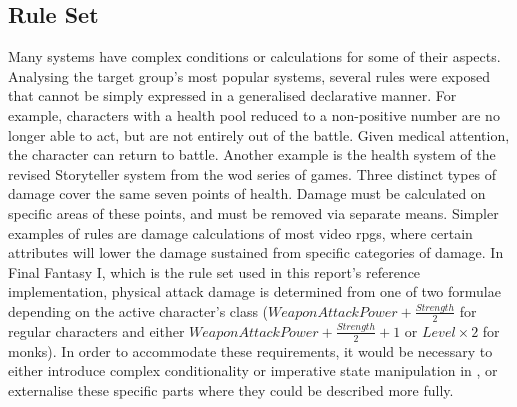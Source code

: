 \subsection{\langname{} Rule Set}
\label{language:ruleset}
Many systems have complex conditions or calculations for some of their aspects. Analysing the target group's most popular systems, several rules were exposed that cannot be simply expressed in a generalised declarative manner. For example, characters with a health pool reduced to a non-positive number are no longer able to act, but are not entirely out of the battle. Given medical attention, the character can return to battle.
Another example is the health system of the revised Storyteller system from the \ac{wod} series of games. Three distinct types of damage cover the same seven points of health. Damage must be calculated on specific areas of these points, and must be removed via separate means.
Simpler examples of rules are damage calculations of most video \ac{rpgs}, where certain attributes will lower the damage sustained from specific categories of damage. In Final Fantasy I, which is the rule set used in this report's reference implementation, physical attack damage is determined from one of two formulae depending on the active character's class ($WeaponAttackPower + \frac{Strength}{2}$ for regular characters and either $WeaponAttackPower + \frac{Strength}{2} + 1$ or $Level \times 2$ for monks).
In order to accommodate these requirements, it would be necessary to either introduce complex conditionality or imperative state manipulation in \langname{}, or externalise these specific parts where they could be described more fully.


